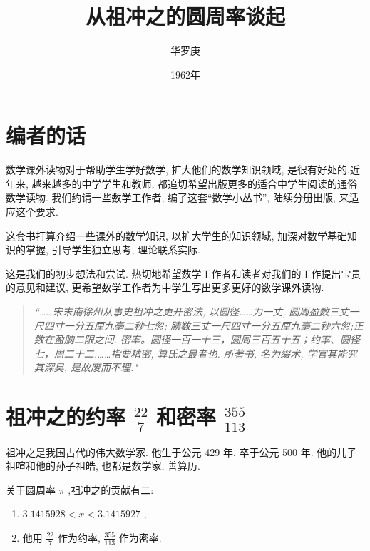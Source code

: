 \documentclass{ctexart}
\title{从祖冲之的圆周率谈起}
\author{华罗庚}
\date{1962年}
\begin{document}
\maketitle

\newpage
\section*{编者的话}

数学课外读物对于帮助学生学好数学, 扩大他们的数学知识领域, 是很有好处的.近年来, 越来越多的中学学生和教师, 都追切希望出版更多的适合中学生阅读的通俗数学读物. 我们约请一些数学工作者, 编了这套“数学小丛书”, 陆续分册出版, 来适应这个要求.

这套书打算介绍一些课外的数学知识, 以扩大学生的知识领域, 加深对数学基础知识的掌握, 引导学生独立思考, 理论联系实际.

这是我们的初步想法和尝试. 热切地希望数学工作者和读者对我们的工作提出宝贵的意见和建议, 更希望数学工作者为中学生写出更多更好的数学课外读物.


\newpage
\begin{quotation}
  \textit{“……宋末南徐州从事史祖冲之更开密法, 以圆径……为一丈, 圆周盈数三丈一尺四寸一分五厘九毫二秒七忽; 胰数三丈一尺四寸一分五厘九毫二秒六忽;正数在盈朒二限之间. 密率。圆径一百一十三，圆周三百五十五；约率、圆径七，周二十二.……指要精密, 算氏之最者也. 所著书, 名为缀术, 学官其能究其深臭, 是故废而不理."}

\end{quotation}

\clearpage

\tableofcontents

\newpage
\section{祖冲之的约率 \(\frac{22}{7}\) 和密率 \(\frac{355}{113}\)}

祖冲之是我国古代的伟大数学家. 他生于公元 429 年, 卒于公元 500 年. 他的儿子祖喧和他的孙子祖皓, 也都是数学家, 善算历.

关于圆周率 \(\pi\) ,祖冲之的贡献有二:

\begin{enumerate}[label=\textup{(\roman*)}]
\item\label{enu:1} \({3.1415928} < x < {3.1415927}\) ,
\item\label{enu:2} 他用 \(\frac{22}{7}\) 作为约率, \(\frac{355}{113}\) 作为密率.
\end{enumerate}
\end{document}
